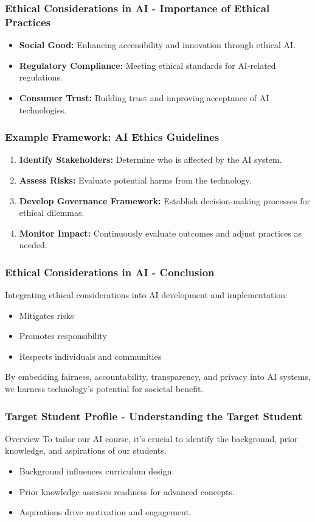 \documentclass[aspectratio=169]{beamer}
\begin{document}
\begin{frame}[fragile]
  \frametitle{Ethical Considerations in AI - Importance of Ethical Practices}
  \begin{itemize}
    \item \textbf{Social Good:} Enhancing accessibility and innovation through ethical AI.
    \item \textbf{Regulatory Compliance:} Meeting ethical standards for AI-related regulations.
    \item \textbf{Consumer Trust:} Building trust and improving acceptance of AI technologies.
  \end{itemize}
\end{frame}

\begin{frame}[fragile]
  \frametitle{Example Framework: AI Ethics Guidelines}
  \begin{enumerate}
    \item \textbf{Identify Stakeholders:} Determine who is affected by the AI system.
    \item \textbf{Assess Risks:} Evaluate potential harms from the technology.
    \item \textbf{Develop Governance Framework:} Establish decision-making processes for ethical dilemmas.
    \item \textbf{Monitor Impact:} Continuously evaluate outcomes and adjust practices as needed.
  \end{enumerate}
\end{frame}

\begin{frame}[fragile]
  \frametitle{Ethical Considerations in AI - Conclusion}
  Integrating ethical considerations into AI development and implementation:
  \begin{itemize}
    \item Mitigates risks
    \item Promotes responsibility
    \item Respects individuals and communities 
  \end{itemize}
  By embedding fairness, accountability, transparency, and privacy into AI systems, we harness technology's potential for societal benefit.
\end{frame}

\begin{frame}[fragile]
    \frametitle{Target Student Profile - Understanding the Target Student}
    \begin{block}{Overview}
        To tailor our AI course, it's crucial to identify the background, prior knowledge, and aspirations of our students.
    \end{block}
    \begin{itemize}
        \item Background influences curriculum design.
        \item Prior knowledge assesses readiness for advanced concepts.
        \item Aspirations drive motivation and engagement.
    \end{itemize}
\end{frame}
\end{document}
